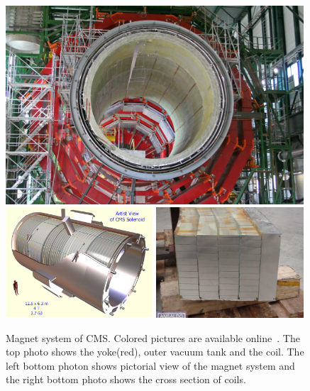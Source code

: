 %
\begin{figure}[h] 
\vspace{1cm}
\includegraphics[width=0.99\textwidth]{figures/Figure_CP-1.jpg} \\
\includegraphics[width=0.49\textwidth]{figures/CMS-solenoid-magnet.jpg} 
\includegraphics[width=0.49\textwidth]{figures/magnet-2000-049.jpg}
\caption{Magnet system of CMS. Colored pictures are available online~\cite{cmstdr1}. 
The top photo shows the yoke(red), outer vacuum tank and the coil. The left bottom 
photon shows pictorial view of the magnet system and the right bottom photo shows 
the cross section of coils.}
\label{fig:magnet} 
\end{figure} 



